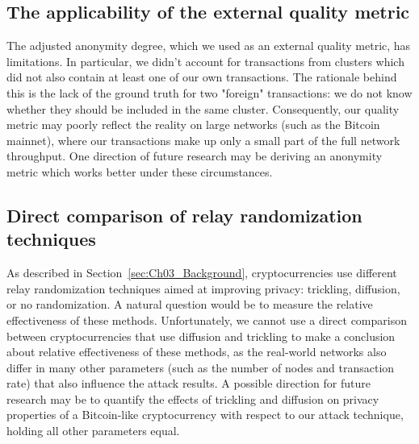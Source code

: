 \subsection{The applicability of the external quality metric}
The adjusted anonymity degree, which we used as an external quality metric, has limitations.
In particular, we didn't account for transactions from clusters which did not also contain at least one of our own transactions.
The rationale behind this is the lack of the ground truth for two "foreign" transactions: we do not know whether they should be included in the same cluster.
Consequently, our quality metric may poorly reflect the reality on large networks (such as the Bitcoin mainnet), where our transactions make up only a small part of the full network throughput.
One direction of future research may be deriving an anonymity metric which works better under these circumstances.

\subsection{Direct comparison of relay randomization techniques}
As described in Section~\ref{sec:Ch03_Background}, cryptocurrencies use different relay randomization techniques aimed at improving privacy: trickling, diffusion, or no randomization.
A natural question would be to measure the relative effectiveness of these methods.
Unfortunately, we cannot use a direct comparison between cryptocurrencies that use diffusion and trickling to make a conclusion about relative effectiveness of these methods, as the real-world networks also differ in many other parameters (such as the number of nodes and transaction rate) that also influence the attack results.
A possible direction for future research may be to quantify the effects of trickling and diffusion on privacy properties of a Bitcoin-like cryptocurrency with respect to our attack technique, holding all other parameters equal.



